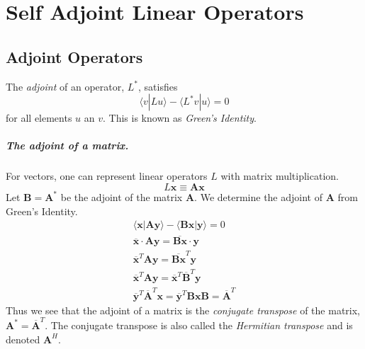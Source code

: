 \flushbottom





\chapter{Self Adjoint Linear Operators}




\section{Adjoint Operators}



The \textit{adjoint} of an operator, $L^*$, satisfies
\[
\langle v | L u \rangle - \langle L^* v | u \rangle = 0
\]
for all elements $u$ an $v$.  This is known as \textit{Green's Identity}.



\paragraph{The adjoint of a matrix.}
For vectors, one can represent linear operators $L$ with matrix multiplication.
\[
L \mathbf{x} \equiv \mathbf{A} \mathbf{x}
\]
Let $\mathbf{B} = \mathbf{A}^*$ be the adjoint of the matrix $\mathbf{A}$.  We determine
the adjoint of $\mathbf{A}$ from Green's Identity.
\begin{gather*}
  \langle \mathbf{x} | \mathbf{A} \mathbf{y} \rangle - \langle \mathbf{B} \mathbf{x} | \mathbf{y} \rangle = 0 \\
  \overline{\mathbf{x}} \cdot \mathbf{A} \mathbf{y} = \overline{\mathbf{B} \mathbf{x}} \cdot \mathbf{y} \\
  \overline{\mathbf{x}}^T \mathbf{A} \mathbf{y} = \overline{\mathbf{B} \mathbf{x}}^T \mathbf{y} \\
  \overline{\mathbf{x}}^T \mathbf{A} \mathbf{y} = \overline{\mathbf{x}}^T \overline{\mathbf{B}}^T \mathbf{y} \\
  \overline{\mathbf{y}}^T \overline{\mathbf{A}}^T \mathbf{x} = \overline{\mathbf{y}}^T \mathbf{B} \mathbf{x} 
  \mathbf{B} = \overline{\mathbf{A}}^T
\end{gather*}
Thus we see that the adjoint of a matrix is the \textit{conjugate transpose} 
of the matrix, $\mathbf{A}^* = \overline{\mathbf{A}}^T$.  The conjugate transpose is also called
the \textit{Hermitian transpose} and is denoted $\mathbf{A}^H$.










